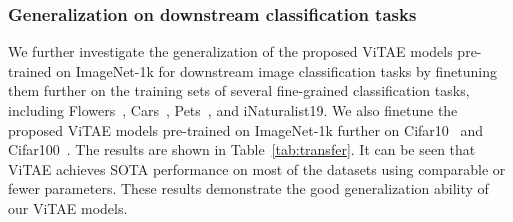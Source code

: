 \documentclass[twocolumn]{svjour3}          \smartqed  \usepackage{natbib}
\begin{document}
\subsubsection{Generalization on downstream classification tasks}
\begin{table*}[htbp]
\footnotesize
  \centering
  \caption{Generalization of ViTAE and SOTA methods on different downstream image classification tasks.}
    \label{tab:transfer}\end{table*}

We further investigate the generalization of the proposed ViTAE models pre-trained on ImageNet-1k for downstream image classification tasks by finetuning them further on the training sets of several fine-grained classification tasks, including Flowers~\citep{Nilsback08}, Cars~\citep{KrauseStarkDengFei-Fei_3DRR2013}, Pets~\citep{parkhi12a}, and iNaturalist19. We also finetune the proposed ViTAE models pre-trained on ImageNet-1k further on Cifar10~\citep{krizhevsky2009learning} and Cifar100~\citep{krizhevsky2009learning}. The results are shown in Table~\ref{tab:transfer}. It can be seen that ViTAE achieves SOTA performance on most of the datasets using comparable or fewer parameters. These results demonstrate the good generalization ability of our ViTAE models.
\end{document}
